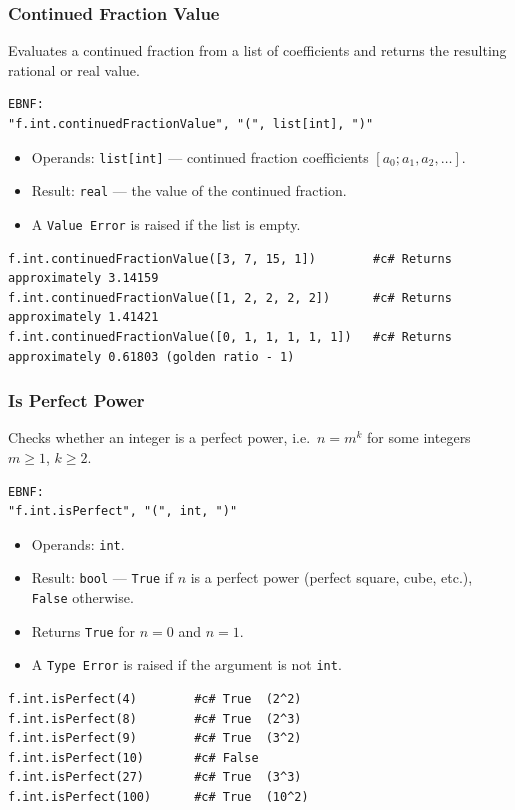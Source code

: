\subsubsection{Continued Fraction Value}
Evaluates a continued fraction from a list of coefficients and returns the resulting rational or real value.
\begin{verbatim}
EBNF:
"f.int.continuedFractionValue", "(", list[int], ")"
\end{verbatim}
\begin{itemize}
\item Operands: \texttt{list[int]} --- continued fraction coefficients $[a_0; a_1, a_2, \ldots]$.
\item Result: \texttt{real} --- the value of the continued fraction.
\item A \texttt{Value Error} is raised if the list is empty.
\end{itemize}
\begin{verbatim}
f.int.continuedFractionValue([3, 7, 15, 1])        #c# Returns approximately 3.14159
f.int.continuedFractionValue([1, 2, 2, 2, 2])      #c# Returns approximately 1.41421
f.int.continuedFractionValue([0, 1, 1, 1, 1, 1])   #c# Returns approximately 0.61803 (golden ratio - 1)
\end{verbatim}

\subsubsection{Is Perfect Power}
Checks whether an integer is a perfect power, i.e.\ $n = m^k$ for some integers $m \geq 1$, $k \geq 2$.
\begin{verbatim}
EBNF:
"f.int.isPerfect", "(", int, ")"
\end{verbatim}
\begin{itemize}
\item Operands: \texttt{int}.
\item Result: \texttt{bool} --- \texttt{True} if $n$ is a perfect power (perfect square, cube, etc.), \texttt{False} otherwise.
\item Returns \texttt{True} for $n = 0$ and $n = 1$.
\item A \texttt{Type Error} is raised if the argument is not \texttt{int}.
\end{itemize}
\begin{verbatim}
f.int.isPerfect(4)        #c# True  (2^2)
f.int.isPerfect(8)        #c# True  (2^3)
f.int.isPerfect(9)        #c# True  (3^2)
f.int.isPerfect(10)       #c# False
f.int.isPerfect(27)       #c# True  (3^3)
f.int.isPerfect(100)      #c# True  (10^2)
\end{verbatim}

